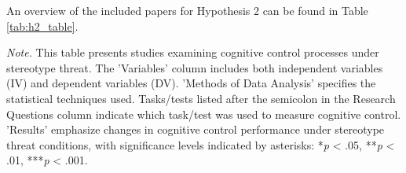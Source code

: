 \documentclass[
  stu, a4paper, 12pt,mask,floatsintext]{apa7}
\newenvironment{lltable}{\begin{landscape}\centering\begin{ThreePartTable}}{\end{ThreePartTable}\end{landscape}}
\begin{document}
An overview of the included papers for Hypothesis 2 can be found in Table \ref{tab:h2_table}.

\begin{lltable}

\begin{TableNotes}[para]
\normalsize{\textit{Note.} This table presents studies examining cognitive control processes under stereotype threat. The 'Variables' column includes both independent variables (IV) and dependent variables (DV). 'Methods of Data Analysis' specifies the statistical techniques used. Tasks/tests listed after the semicolon in the Research Questions column indicate which task/test was used to measure cognitive control. 'Results' emphasize changes in cognitive control performance under stereotype threat conditions, with significance levels indicated by asterisks: *\textit{p} < .05, **\textit{p} < .01, ***\textit{p} < .001.}
\end{TableNotes}

\small{

}
\end{lltable}
\end{document}
